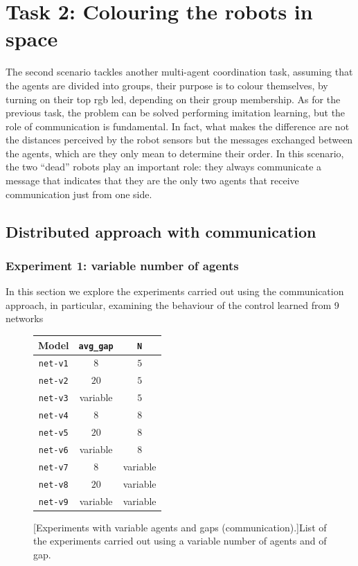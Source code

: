 \section{Task 2: Colouring the robots in space}
\label{sec:task2}

The second scenario tackles another multi-agent coordination task, assuming that 
the agents are divided into groups, their purpose is to colour themselves, by 
turning on their top \gls{rgb} \gls{led}, depending on their group membership. 
As for the previous task, the problem can be solved performing imitation 
learning, but the role of communication is fundamental. In fact, what makes the 
difference are not the distances perceived by the robot sensors but the messages 
exchanged between the agents, which are they only mean to determine their 
order. 
In this scenario, the two ``dead'' robots play an important role: they always 
communicate a message that indicates that they are the only two agents that 
receive communication just from one side.

\subsection{Distributed approach with communication}
\label{subsec:task2-exp-comm}

\subsubsection{Experiment 1: variable number of agents}
\label{subsubsec:task2-exp-comm-1}
In this section we explore the experiments carried out using the communication 
approach, in particular, examining the behaviour of the control learned from 9 
networks 
\begin{figure}[!htb]
	\centering
	\begin{tabular}{ccc}
		\toprule
		\textbf{Model} \quad & \textbf{\texttt{avg\_gap}} & \textbf{\texttt{N}}\\
		\midrule
		\texttt{net-v1}   &  $8$		 &	 $5$ \\
		\texttt{net-v2}   &  $20$		&	$5$ \\
		\texttt{net-v3}   &  variable   &    $5$\\
		\texttt{net-v4}   &  $8$		 &	  $8$ \\
		\texttt{net-v5}   & $20$   		&	 $8$ \\
		\texttt{net-v6}   &  variable	&	 $8$ \\
		\texttt{net-v7}   &  $ 8$		  &	 variable\\
		\texttt{net-v8}   &  $20$		 &	variable\\
		\texttt{net-v9}   &  variable	 &	variable\\
		\bottomrule
	\end{tabular}
	[Experiments with variable agents and gaps 
	(communication).]{List of the experiments carried out using a variable number 
		of agents and of gap.}
	\label{tab:modelcommt2}
\end{figure}

